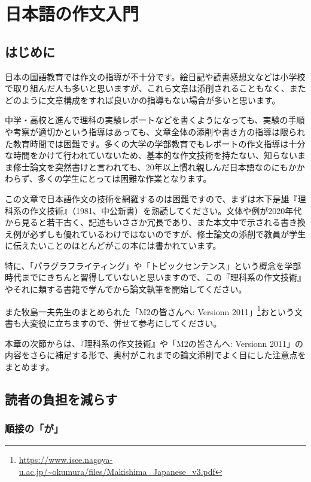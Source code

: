 \chapter{日本語の作文入門}

\section{はじめに}

日本の国語教育では作文の指導が不十分です。絵日記や読書感想文などは小学校で取り組んだ人も多いと思いますが、これら文章は添削されることもなく、またどのように文章構成をすれば良いかの指導もない場合が多いと思います。

中学・高校と進んで理科の実験レポートなどを書くようになっても、実験の手順や考察が適切かという指導はあっても、文章全体の添削や書き方の指導は限られた教育時間では困難です。多くの大学の学部教育でもレポートの作文指導は十分な時間をかけて行われていないため、基本的な作文技術を持たない、知らないまま修士論文を突然書けと言われても、20年以上慣れ親しんだ日本語なのにもかかわらず、多くの学生にとっては困難な作業となります。

この文章で日本語作文の技術を網羅するのは困難ですので、まずは木下是雄『理科系の作文技術』（1981、中公新書）を熟読してください。文体や例が2020年代から見ると若干古く、記述もいささか冗長であり、また本文中で示される書き換え例が必ずしも優れているわけではないのですが、修士論文の添削で教員が学生に伝えたいことのほとんどがこの本には書かれています。

特に、「パラグラフライティング」や「トピックセンテンス」という概念を学部時代までにきちんと習得していないと思いますので、この『理科系の作文技術』やそれに類する書籍で学んでから論文執筆を開始してください。

また牧島一夫先生のまとめられた「M2の皆さんへ: Versionn 2011」\footnote{\url{https://www.isee.nagoya-u.ac.jp/~okumura/files/Makishima_Japanese_v3.pdf}}おという文書も大変役に立ちますので、併せて参考にしてください。

本章の次節からは、『理科系の作文技術』や「M2の皆さんへ: Versionn 2011」の内容をさらに補足する形で、奥村がこれまでの論文添削でよく目にした注意点をまとめます。

\section{読者の負担を減らす}

\subsection{順接の「が」}

